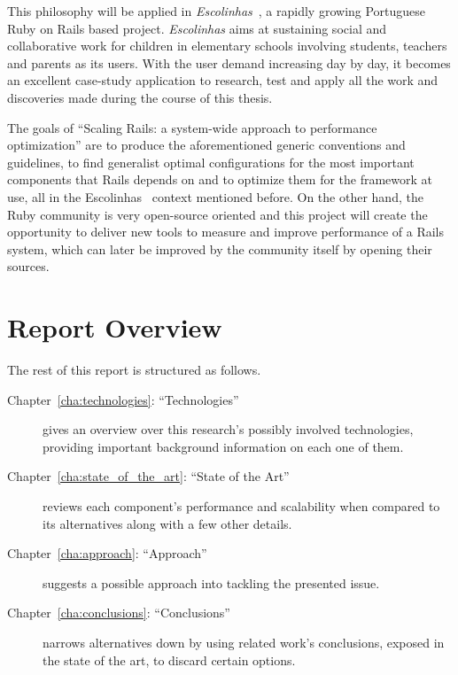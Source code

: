 This philosophy will be applied in \textit{Escolinhas}~\cite{escolinhas}, a rapidly growing Portuguese Ruby on Rails based project. \textit{Escolinhas} aims at sustaining social and collaborative work for children in elementary schools involving students, teachers and parents as its users. With the user demand increasing day by day, it becomes an excellent case-study application to research, test and apply all the work and discoveries made during the course of this thesis.

The goals of ``Scaling Rails: a system-wide approach to performance optimization'' are to produce the aforementioned generic conventions and guidelines, to find generalist optimal configurations for the most important components that Rails depends on and to optimize them for the framework at use, all in the Escolinhas~\cite{escolinhas} context mentioned before. On the other hand, the Ruby community is very open-source oriented and this project will create the opportunity to deliver new tools to measure and improve performance of a Rails system, which can later be improved by the community itself by opening their sources.


\section{Report Overview} %
\label{sec:report_overview}
The rest of this report is structured as follows.
\begin{description}
  \item[Chapter~\ref{cha:technologies}: ``Technologies''] gives an overview over this research's possibly involved technologies, providing important background information on each one of them.
  \item[Chapter~\ref{cha:state_of_the_art}: ``State of the Art''] reviews each component's performance and scalability when compared to its alternatives along with a few other details.
  \item[Chapter~\ref{cha:approach}: ``Approach''] suggests a possible approach into tackling the presented issue.
  \item[Chapter~\ref{cha:conclusions}: ``Conclusions''] narrows alternatives down by using related work's conclusions, exposed in the state of the art, to discard certain options.
\end{description}

